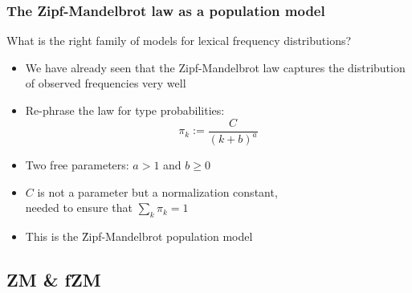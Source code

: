 \documentclass[t]{beamer} %
\begin{document}
\begin{frame}
  \frametitle{The Zipf-Mandelbrot law as a population model}

  What is the right family of models for lexical frequency distributions?
  \begin{itemize}
  \item We have already seen that the Zipf-Mandelbrot law captures the
    distribution of observed frequencies very well%
    \pause
  \item Re-phrase the law for type probabilities:
    \[ \pi_k := \frac{C}{(k + b) ^ a} \]
  \item Two free parameters: $a > 1$ and $b \geq 0$
  \item $C$ is not a parameter but a normalization constant,\\
    needed to ensure that $\sum_k \pi_k = 1$
  \item This is the \h{Zipf-Mandelbrot} population model
  \end{itemize}
\end{frame}

\subsection{ZM \& fZM}
\end{document}
